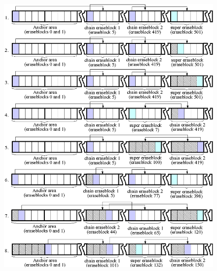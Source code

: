%
%
\begin{figure}[!t]
\begin{center}
\begin{htmlonly}
\includegraphics{pics/sb-02.png}
\end{htmlonly}

\end{center}
\end{figure}
